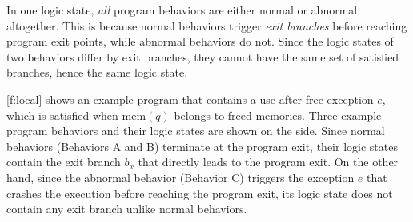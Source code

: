 \documentclass[letterpaper,twocolumn,10pt]{article}
\begin{document}
In one logic state, \emph{all} program behaviors are either normal or abnormal
altogether. 
%
This is because normal behaviors trigger \emph{exit branches} before
reaching program exit points, while abnormal behaviors do not. Since the logic
states of two behaviors differ by exit branches, they cannot have the same set
of satisfied branches, hence the same logic state.

\autoref{f:local} shows an example program that contains a use-after-free
exception $e$, which is satisfied when $\mathrm{mem}(q)$ belongs to freed
memories. Three example program behaviors and their logic states are shown on
the side. Since normal behaviors (Behaviors A and B) terminate at the program
exit, their logic states contain the exit branch $b_x$ that directly leads to
the program exit. On the other hand, since the abnormal behavior (Behavior C)
triggers the exception $e$ that crashes the execution before reaching the
program exit, its logic state does not contain any exit branch unlike normal
behaviors.

%
%
%
%
%
\end{document}
